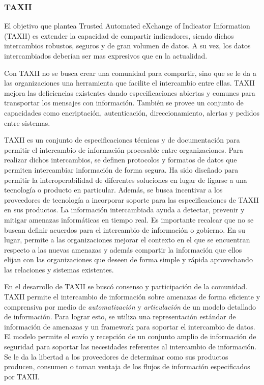 \subsubsection{TAXII}

El objetivo que plantea Trusted Automated eXchange of Indicator Information (TAXII) es extender la capacidad de compartir indicadores, 
siendo dichos intercambios robustos, seguros y de gran volumen de datos. A su 
vez, los datos intercambiados deberían ser mas expresivos que en la actualidad.

Con TAXII no se busca crear una comunidad para compartir, sino que se le da a 
las organizaciones una herramienta que facilite el intercambio entre ellas. 
TAXII mejora las deficiencias existentes dando especificaciones abiertas y 
comunes para transportar los mensajes con información. También se provee un 
conjunto de capacidades como encriptación, autenticación, direccionamiento, 
alertas y pedidos entre sistemas.

TAXII es un conjunto de especificaciones técnicas y de documentación para 
permitir el intercambio de información procesable entre organizaciones. Para 
realizar dichos intercambios, se definen protocolos y formatos de datos que 
permiten intercambiar información de forma segura. Ha sido diseñado para permitir la
interoperabilidad de diferentes soluciones en lugar de ligarse a una tecnología o producto en particular.
Además, se busca incentivar a los proveedores de tecnología a incorporar soporte para las especificaciones
de TAXII en sus productos. La información intercambiada 
ayuda a detectar, prevenir y mitigar amenazas informáticas en tiempo real. Es 
importante recalcar que no se buscan definir acuerdos para el intercambio de 
información o gobierno. En su lugar, permite a las organizaciones mejorar el 
contexto en el que se encuentran respecto a las nuevas amenazas y además 
compartir la información que ellos elijan con las organizaciones que deseen de 
forma simple y rápida aprovechando las relaciones y sistemas existentes.

En el desarrollo de TAXII se buscó consenso y participación de la comunidad. 
TAXII permite el intercambio de información sobre amenazas de forma eficiente y 
comprensiva por medio de \emph{automatización} y \emph{articulación} de un 
modelo detallado de información. Para lograr esto, se utiliza una representación 
estándar de información de amenazas y un framework para soportar el intercambio 
de datos. El modelo permite el envío y recepción de un conjunto amplio de 
información de seguridad para soportar las necesidades referentes al intercambio 
de información. Se le da la libertad a los proveedores de determinar como sus 
productos producen, consumen o toman ventaja de los flujos de información 
especificados por TAXII.

